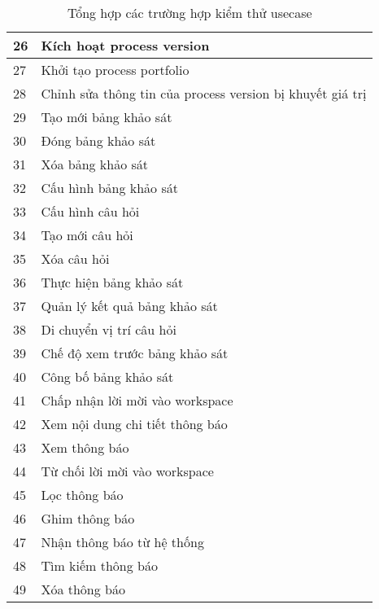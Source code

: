 \begin{table}[H]
{\begin{tabular}{|p{2cm}|p{10cm}|}
    {26} & {Kích hoạt process version} \\ \hline
    {27} & {Khởi tạo process portfolio} \\ \hline
    {28} & {Chỉnh sửa thông tin của process version bị khuyết giá trị} \\ \hline
    {29} & {Tạo mới bảng khảo sát} \\ \hline
    {30} & {Đóng bảng khảo sát} \\ \hline
    {31} & {Xóa bảng khảo sát} \\ \hline
    {32} & {Cấu hình bảng khảo sát} \\ \hline
    {33} & {Cấu hình câu hỏi} \\ \hline
    {34} & {Tạo mới câu hỏi} \\ \hline
    {35} & {Xóa câu hỏi} \\ \hline
    {36} & {Thực hiện bảng khảo sát} \\ \hline
    {37} & {Quản lý kết quả bảng khảo sát} \\ \hline
    {38} & {Di chuyển vị trí câu hỏi} \\ \hline
    {39} & {Chế độ xem trước bảng khảo sát} \\ \hline
    {40} & {Công bố bảng khảo sát} \\ \hline
    {41} & {Chấp nhận lời mời vào workspace} \\ \hline
    {42} & {Xem nội dung chi tiết thông báo} \\ \hline
    {43} & {Xem thông báo} \\ \hline
    {44} & {Từ chối lời mời vào workspace} \\ \hline
    {45} & {Lọc thông báo} \\ \hline
    {46} & {Ghim thông báo} \\ \hline
    {47} & {Nhận thông báo từ hệ thống} \\ \hline
    {48} & {Tìm kiếm thông báo} \\ \hline
    {49} & {Xóa thông báo} \\ \hline
    \end{tabular}%
    }
    \caption{Tổng hợp các trường hợp kiểm thử usecase}
\end{table}